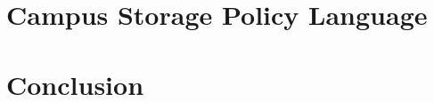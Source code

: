 \documentclass[print,phd]{nuthesis}
\begin{document}


\chapter{Campus Storage Policy Language}


\chapter{Conclusion}


\backmatter

\appendix






\end{document}
